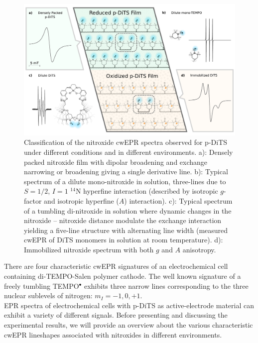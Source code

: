 \begin{figure}[H]
\center
	\includegraphics[width=1\textwidth]{./operando_epr/figures/Cartoon_ALL.pdf}
	\caption{Classification of the nitroxide cwEPR spectra observed for p-DiTS under different conditions and in different environments. a): Densely packed nitroxide film with dipolar broadening and exchange narrowing or broadening giving a single derivative line. b): Typical spectrum of a dilute mono-nitroxide in solution, three-lines due to $S=1/2$, $I=1$ $^{14}$N hyperfine interaction (described by isotropic $g$-factor and isotropic hyperfine ($A$) interaction). c): Typical spectrum of a tumbling di-nitroxide in solution where dynamic changes in the nitroxide -- nitroxide distance modulate the exchange interaction yielding a five-line structure with alternating line width (measured cwEPR of DiTS monomers in solution at room temperature). d): Immobilized nitroxide spectrum with both $g$ and $A$ anisotropy.}
	\label{fig:cartoon_spectra_dts}
\end{figure}

There are four characteristic cwEPR signatures of an electrochemical cell containing di-TEMPO-Salen polymer cathode. The well known signature of a freely tumbling TEMPO$^{\bullet}$ exhibits three narrow lines corresponding to the three nuclear sublevels of nitrogen: $m_I=-1,0,+1$.\\

EPR spectra of electrochemical cells with p-DiTS as active-electrode material can exhibit a variety of different signals. Before presenting and discussing the experimental results, we will provide an overview about the various characteristic cwEPR lineshapes associated with nitroxides in different environments.
\par

